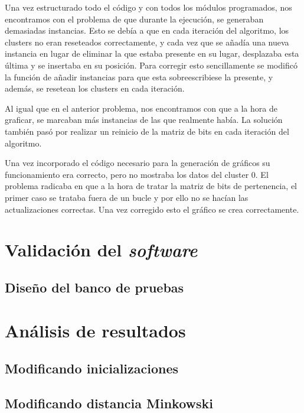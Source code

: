 \documentclass[10pt,a4paper]{article}
\begin{document}
Una vez estructurado todo el código y con todos los módulos programados, nos encontramos con el problema de que durante la ejecución, 
se generaban demasiadas instancias. Esto se debía a que en cada iteración del algoritmo, los clusters no eran reseteados correctamente, y cada vez que se añadía 
una nueva instancia en lugar de eliminar la que estaba presente en su lugar, desplazaba esta última y se insertaba en su posición. Para corregir esto sencillamente
se modificó la función de añadir instancias para que esta sobreescribiese la presente, y además, se resetean los clusters en cada iteración.

Al igual que en el anterior problema, nos encontramos con que a la hora de graficar, se marcaban más instancias de las que realmente había. La solución también pasó por 
realizar un reinicio de la matriz de bits en cada iteración del algoritmo.

Una vez incorporado el código necesario para la generación de gráficos su funcionamiento era correcto, pero no mostraba los datos del cluster 0. El problema radicaba
 en que a la hora de tratar la matriz de bits de pertenencia, el primer caso se trataba fuera de un bucle y por ello no se hacían las actualizaciones correctas. Una 
 vez corregido esto el gráfico se crea correctamente.


\section{Validación del \textit{software}}

\subsection{Diseño del banco de pruebas}

\section{Análisis de resultados}

\subsection{Modificando inicializaciones}

\subsection{Modificando distancia Minkowski}
\end{document}
